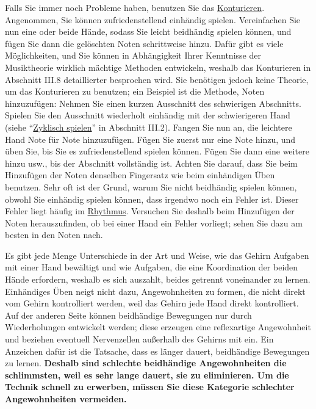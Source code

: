 Falls Sie immer noch Probleme haben, benutzen Sie das \hyperlink{c1iii8}{Konturieren}.
Angenommen, Sie können zufriedenstellend einhändig spielen.
Vereinfachen Sie nun eine oder beide Hände, sodass Sie leicht beidhändig spielen können, und fügen Sie dann die gelöschten Noten schrittweise hinzu.
Dafür gibt es viele Möglichkeiten, und Sie können in Abhängigkeit Ihrer Kenntnisse der Musiktheorie wirklich mächtige Methoden entwickeln, weshalb das Konturieren in Abschnitt III.8 detaillierter besprochen wird.
Sie benötigen jedoch keine Theorie, um das Konturieren zu benutzen; ein Beispiel ist die Methode, Noten hinzuzufügen: Nehmen Sie einen kurzen Ausschnitt des schwierigen Abschnitts.
Spielen Sie den Ausschnitt wiederholt einhändig mit der schwierigeren Hand (siehe \enquote{\hyperlink{c1iii2}{Zyklisch spielen}} in Abschnitt III.2).
Fangen Sie nun an, die leichtere Hand Note für Note hinzuzufügen.
Fügen Sie zuerst nur eine Note hinzu, und üben Sie, bis Sie es zufriedenstellend spielen können.
Fügen Sie dann eine weitere hinzu usw., bis der Abschnitt vollständig ist.
Achten Sie darauf, dass Sie beim Hinzufügen der Noten denselben Fingersatz wie beim einhändigen Üben benutzen.
Sehr oft ist der Grund, warum Sie nicht beidhändig spielen können, obwohl Sie einhändig spielen können, dass irgendwo noch ein Fehler ist.
Dieser Fehler liegt häufig im \hyperlink{c1iii1b}{Rhythmus}.
Versuchen Sie deshalb beim Hinzufügen der Noten herauszufinden, ob bei einer Hand ein Fehler vorliegt;
sehen Sie dazu am besten in den Noten nach.

Es gibt jede Menge Unterschiede in der Art und Weise, wie das Gehirn Aufgaben mit einer Hand bewältigt und wie Aufgaben, die eine Koordination der beiden Hände erfordern, weshalb es sich auszahlt, beides getrennt voneinander zu lernen.
Einhändiges Üben neigt nicht dazu, Angewohnheiten zu formen, die nicht direkt vom Gehirn kontrolliert werden, weil das Gehirn jede Hand direkt kontrolliert.
Auf der anderen Seite können beidhändige Bewegungen nur durch Wiederholungen entwickelt werden; diese erzeugen eine reflexartige Angewohnheit und beziehen eventuell Nervenzellen außerhalb des Gehirns mit ein.
Ein Anzeichen dafür ist die Tatsache, dass es länger dauert, beidhändige Bewegungen zu lernen.
\textbf{Deshalb sind schlechte beidhändige Angewohnheiten die schlimmsten, weil es sehr lange dauert, sie zu eliminieren.
Um die Technik schnell zu erwerben, müssen Sie diese Kategorie schlechter Angewohnheiten vermeiden.}

